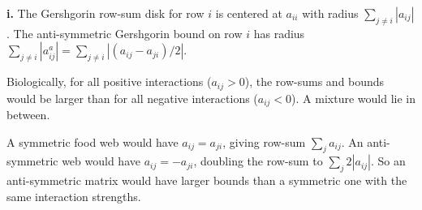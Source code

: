 \documentclass{article}
\begin{document}
\textbf{i.} The Gershgorin row-sum disk for row $i$ is centered at $a_{ii}$ with radius $\sum_{j \neq i} |a_{ij}|$. The anti-symmetric Gershgorin bound on row $i$ has radius $\sum_{j \neq i} |a_{ij}^a| = \sum_{j \neq i} |(a_{ij} - a_{ji})/2|$.

Biologically, for all positive interactions ($a_{ij} > 0$), the row-sums and bounds would be larger than for all negative interactions ($a_{ij} < 0$). A mixture would lie in between.

A symmetric food web would have $a_{ij} = a_{ji}$, giving row-sum $\sum_j a_{ij}$. An anti-symmetric web would have $a_{ij} = -a_{ji}$, doubling the row-sum to $\sum_j 2|a_{ij}|$. So an anti-symmetric matrix would have larger bounds than a symmetric one with the same interaction strengths.
\end{document}
